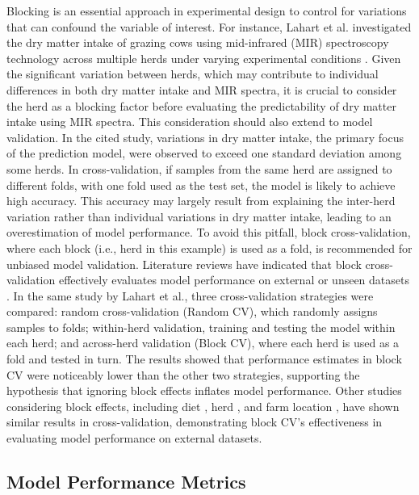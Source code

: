 Blocking is an essential approach in experimental design to control for variations that can confound the variable of interest. For instance, Lahart et al. investigated the dry matter intake of grazing cows using mid-infrared (MIR) spectroscopy technology across multiple herds under varying experimental conditions \citep{lahart_predicting_2019}. Given the significant variation between herds, which may contribute to individual differences in both dry matter intake and MIR spectra, it is crucial to consider the herd as a blocking factor before evaluating the predictability of dry matter intake using MIR spectra. This consideration should also extend to model validation. In the cited study, variations in dry matter intake, the primary focus of the prediction model, were observed to exceed one standard deviation among some herds. In cross-validation, if samples from the same herd are assigned to different folds, with one fold used as the test set, the model is likely to achieve high accuracy. This accuracy may largely result from explaining the inter-herd variation rather than individual variations in dry matter intake, leading to an overestimation of model performance. To avoid this pitfall, block cross-validation, where each block (i.e., herd in this example) is used as a fold, is recommended for unbiased model validation.
Literature reviews have indicated that block cross-validation effectively evaluates model performance on external or unseen datasets \citep{bresolin_infrared_2020}. In the same study by Lahart et al., three cross-validation strategies were compared: random cross-validation (Random CV), which randomly assigns samples to folds; within-herd validation, training and testing the model within each herd; and across-herd validation (Block CV), where each herd is used as a fold and tested in turn. The results showed that performance estimates in block CV were noticeably lower than the other two strategies, supporting the hypothesis that ignoring block effects inflates model performance. Other studies considering block effects, including diet \citep{grelet_potential_2020}, herd \citep{rovere_prediction_2021}, and farm location \citep{adriaens_productive_2020, mota_real-time_2022}, have shown similar results in cross-validation, demonstrating block CV's effectiveness in evaluating model performance on external datasets.

\subsection{Model Performance Metrics}

